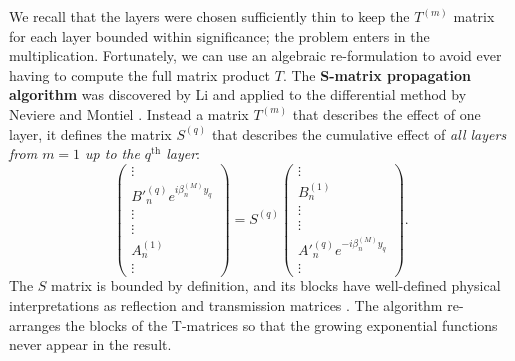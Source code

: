 We recall that the layers were chosen sufficiently thin to keep the $T^{(m)}$ matrix for each layer bounded within significance; the problem enters in the multiplication.  Fortunately, we can use an algebraic re-formulation to avoid ever having to compute the full matrix product $T$.  The \textbf{S-matrix propagation algorithm} was discovered by Li \cite{Li96} and applied to the differential method by Neviere and Montiel \cite{Nev96}.  Instead a matrix $T^{(m)}$ that describes the effect of one layer, it defines the matrix $S^{(q)}$ that describes the cumulative effect of \emph{all layers from $m=1$ up to the $q^\textrm{th}$ layer}:
\begin{equation}
 \left(\begin{array}{c}\vdots \\ B'^{(q)}_n  e^{i \beta^{(M)}_n y_q} \\ \vdots \\\hline \vdots \\ A^{(1)}_n \\ \vdots\end{array}\right) = S^{(q)} \left(\begin{array}{c}\vdots \\ B^{(1)}_n  \\ \vdots \\\hline \vdots \\ A'^{(q)}_n e^{-i \beta^{(M)}_n y_q} \\ \vdots\end{array}\right) .
 \label{sMatrixDef}
\end{equation}
The $S$ matrix is bounded by definition, and its blocks have well-defined physical interpretations as reflection and transmission matrices \cite[Chapter 3]{Nev02}.  The algorithm re-arranges the blocks of the T-matrices so that the growing exponential functions never appear in the result.

